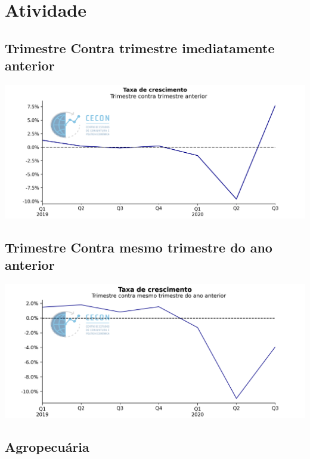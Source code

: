 \documentclass{SelfArx}
\begin{document}
\section*{Atividade}
\label{sec:org044815c}



\subsection*{Trimestre Contra trimestre imediatamente anterior}
\label{sec:org28c7f7e}

\begin{center}
\includegraphics[width=.9\linewidth]{./figs/PIB/PIB.png}
\end{center}

\subsection*{Trimestre Contra mesmo trimestre do ano anterior}
\label{sec:orgeb63aa7}

\begin{center}
\includegraphics[width=.9\linewidth]{./figs/PIB/PIB_YoY.png}
\end{center}

\subsection*{Agropecuária}
\label{sec:orgc8beab1}
\end{document}
